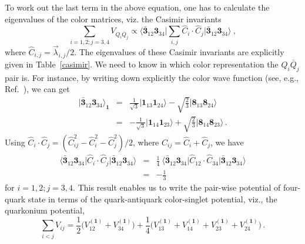 \documentclass[twocolumn,showpacs,superscriptaddress,preprintnumbers,nofootinbib,prd]{revtex4-1}
\def\be{\begin{equation}}
\def\ee{\end{equation}}
\begin{document}
To work out the last term in the above equation,
one has to calculate the eigenvalues of the color matrices, viz.
the Casimir invariants
\be
\sum_{i=1,2;j=3,4} V_{Q_i \bar{Q}_j} \propto \Big\langle \bar{\textbf{3}}_{12}
\textbf{3}_{34} \Big| \sum_{i,j} \hat{C}_i \cdot \hat{C}_j \Big|
\bar{\textbf{3}}_{12} \textbf{3}_{34} \Big\rangle~,
\ee
where $\hat{C}_{i,j}= \vec{\lambda}_{i,j}/2$. The eigenvalues of these Casimir
invariants are explicitly given in Table~\ref{casimir}. We need to know in
which
color representation the $Q_i \bar Q_j$ pair is.
For instance, by writing down
explicitly the color wave function (see, e.g., Ref.~\cite{Stancu}), we can get
\begin{eqnarray}
\big| \bar{\textbf{3}}_{12} \textbf{3}_{34} \big\rangle_\textbf{1} &=&
 \frac1{\sqrt{3}}  \big| \textbf{1}_{13} \textbf{1}_{24}\big\rangle -
\sqrt{\frac23} \big| \textbf{8}_{13} \textbf{8}_{24} \big\rangle  \nonumber\\
 &=&  -\frac1{\sqrt{3}}  \big| \textbf{1}_{14} \textbf{1}_{23}\big\rangle +
\sqrt{\frac23} \big| \textbf{8}_{14} \textbf{8}_{23} \big\rangle\,.
\end{eqnarray}
Using $\hat{C}_i \cdot \hat{C}_j = \left(\hat C_{ij}^2 - \hat C_i^2 - \hat
C_j^2 \right)/2$, where $\hat C_{ij} = \hat C_i + \hat C_j$, we have
\begin{eqnarray}
\big\langle \bar{\textbf{3}}_{12} \textbf{3}_{34} \big| \hat{C}_{i} \cdot
\hat{C}_{j} \big| \bar{\textbf{3}}_{12} \textbf{3}_{34} \big\rangle &=&
 \frac{1}{4}~\big\langle \bar{\textbf{3}}_{12} \textbf{3}_{34} \big|
\hat{C}_{12} \cdot \hat{C}_{34} \big| \bar{\textbf{3}}_{12} \textbf{3}_{34}
\big\rangle \nonumber\\
&=& - \frac13
\end{eqnarray}
for $i=1,2; j=3,4$.
This result enables us to write the pair-wise potential
of four-quark state in terms of the quark-antiquark color-singlet potential, viz.,
the quarkonium potential,
\be
\sum_{i<j} V_{ij} =
\frac{1}{2} \bigg (V_{12}^{(\textbf{1})} + V_{34}^{(\textbf{1})} \bigg)+
\frac{1}{4} \bigg( V_{13}^{(\textbf{1})} + V_{14}^{(\textbf{1})} +
V_{23}^{(\textbf{1})} + V_{24}^{(\textbf{1})} \bigg)\,.
\ee
\end{document}
